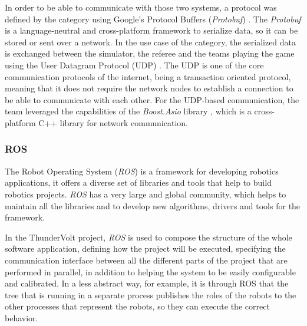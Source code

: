 In order to be able to communicate with those two systems, a protocol was defined by the category \cite{VSSProto} using Google's Protocol Buffers (\textit{Protobuf}) \cite{Protobuf}. The \textit{Protobuf} is a language-neutral and cross-platform framework to serialize data, so it can be stored or sent over a network. In the use case of the category, the serialized data is exchanged between the simulator, the referee and the teams playing the game using the User Datagram Protocol (UDP) \cite{rfc768}. The UDP is one of the core communication protocols of the internet, being a transaction oriented protocol, meaning that it does not require the network nodes to establish a connection to be able to communicate with each other. For the UDP-based communication, the team leveraged the capabilities of the \textit{Boost.Asio} library \cite{BoostAsio}, which is a cross-platform C++ library for network communication.

\subsubsection{ROS}

The Robot Operating System (\textit{ROS}) \cite{ROS} is a framework for developing robotics applications, it offers a diverse set of libraries and tools that help to build robotics projects. \textit{ROS} has a very large and global community, which helps to maintain all the libraries and to develop new algorithms, drivers and tools for the framework.

In the ThunderVolt project, \textit{ROS} is used to compose the structure of the whole software application, defining how the project will be executed, specifying the communication interface between all the different parts of the project that are performed in parallel, in addition to helping the system to be easily configurable and calibrated. In a less abstract way, for example, it is through ROS that the tree that is running in a separate process publishes the roles of the robots to the other processes that represent the robots, so they can execute the correct behavior.
